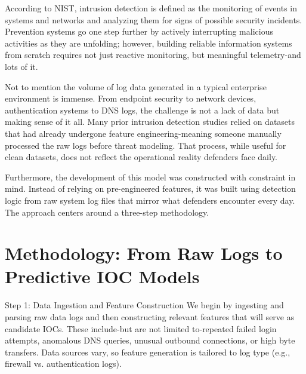 According to NIST, intrusion detection is defined as the monitoring of events in systems and networks and analyzing them for signs of possible security incidents. Prevention systems go one step further by actively interrupting malicious activities as they are unfolding; however, building reliable information systems from scratch requires not just reactive monitoring, but meaningful telemetry-and lots of it.

Not to mention the volume of log data generated in a typical enterprise environment is immense. From endpoint security to network devices, authentication systems to DNS logs, the challenge is not a lack of data but making sense of it all. Many prior intrusion detection studies relied on datasets that had already undergone feature engineering-meaning someone manually processed the raw logs before threat modeling. That process, while useful for clean datasets, does not reflect the operational reality defenders face daily.

Furthermore, the development of this model was constructed with constraint in mind. Instead of relying on pre-engineered features, it was built using detection logic from raw system log files that mirror what defenders encounter every day. The approach centers around a three-step methodology.

\section{Methodology: From Raw Logs to Predictive IOC Models}
Step 1: Data Ingestion and Feature Construction
We begin by ingesting and parsing raw data logs and then constructing relevant features that will serve as candidate IOCs. These include-but are not limited to-repeated failed login attempts, anomalous DNS queries, unusual outbound connections, or high byte transfers. Data sources vary, so  feature generation is tailored to log type (e.g., firewall vs. authentication logs).

